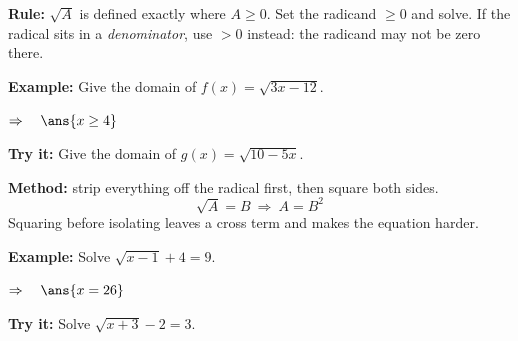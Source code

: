 \documentclass[12pt]{article}
\begin{document}


\begin{formulabox}
\textbf{Rule:} $\sqrt{A}$ is defined exactly where $A \ge 0$. Set the radicand
$\ge 0$ and solve. If the radical sits in a \emph{denominator}, use $> 0$
instead: the radicand may not be zero there.
\end{formulabox}

\begin{examplebox}
\textbf{Example:} \quad Give the domain of $f(x) = \sqrt{3x-12}$.

$\Rightarrow\quad \ans{x \ge 4}$
\end{examplebox}

\begin{tryitbox}
\textbf{Try it:} \quad Give the domain of $g(x) = \sqrt{10-5x}$.\\[2pt]
\end{tryitbox}


\begin{formulabox}
\textbf{Method:} strip everything off the radical first, then square both sides.
\[ \sqrt{A} = B \ \Longrightarrow \ A = B^2 \]
Squaring before isolating leaves a cross term and makes the equation harder.
\end{formulabox}

\begin{examplebox}
\textbf{Example:} \quad Solve $\sqrt{x-1} + 4 = 9$.

$\Rightarrow\quad \ans{x = 26}$
\end{examplebox}

\begin{tryitbox}
\textbf{Try it:} \quad Solve $\sqrt{x+3} - 2 = 3$.\\[2pt]
\end{tryitbox}

\end{document}
